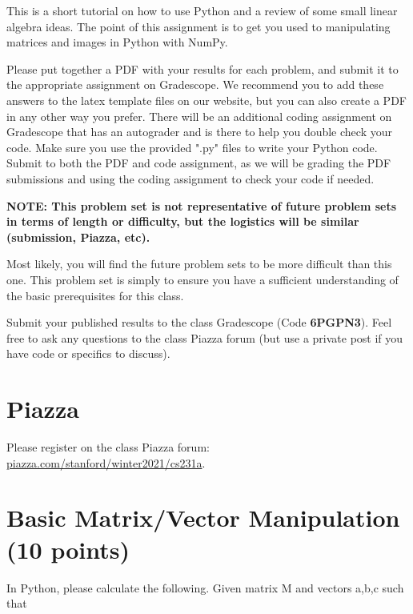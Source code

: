 




This is a short tutorial on how to use Python and a review of some small linear algebra ideas.
The point of this assignment is to get you used to manipulating matrices and images in Python with NumPy.

Please put together a PDF with your results for each problem, and submit it to the appropriate assignment on Gradescope. 
We recommend you to add these answers to the latex template files on our website, but you can also create a PDF in any other way you prefer.
There will be an additional coding assignment on Gradescope that has an autograder and is there to help you double check your code. 
Make sure you use the provided ".py" files to write your Python code. 
Submit to both the PDF and code assignment, as we will be grading the PDF submissions and using the coding assignment to check your code if needed.

\textbf{NOTE: This problem set is not representative of future problem sets in terms of length or difficulty, 
but the logistics will be similar (submission, Piazza, etc).} 

Most likely, you will find the future problem sets to be more difficult than this one. This problem set is simply to ensure 
you have a sufficient understanding of the basic prerequisites for this class.

Submit your published results to the class Gradescope (Code \textbf{6PGPN3}). Feel free to ask any questions to the 
class Piazza forum (but use a private post if you have code or specifics to discuss).

\section{Piazza}
Please register on the class Piazza forum: \url{ piazza.com/stanford/winter2021/cs231a}.


\section{Basic Matrix/Vector Manipulation (10 points)}
In Python, please calculate the following. Given matrix M and vectors a,b,c such that
\\

